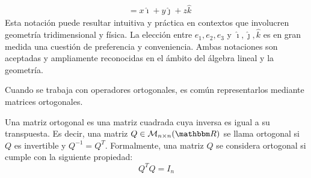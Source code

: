 \begin{example}
\begin{align*}
        & = x\hat{\imath} + y\hat{\jmath} + z\hat{k}
    \end{align*}
    Esta notación puede resultar intuitiva y práctica en contextos que involucren geometría tridimensional y física. La elección entre \( e_1, e_2, e_3 \) y \( \hat{\imath}, \hat{\jmath}, \hat{k} \) es en gran medida una cuestión de preferencia y conveniencia. Ambas notaciones son aceptadas y ampliamente reconocidas en el ámbito del álgebra lineal y la geometría.
\end{example}

Cuando se trabaja con operadores ortogonales, es común representarlos mediante matrices ortogonales.
\begin{definition}\label{def:matrixortogonal}
    Una matriz ortogonal es una matriz cuadrada cuya inversa es igual a su transpuesta. Es decir, una matriz $Q \in \mathcal{M}_{n \times n}(\RR)$ se llama ortogonal si $Q$ es invertible y $Q^{-1} = Q^T$. Formalmente, una matriz \( Q \) se considera ortogonal si cumple con la siguiente propiedad:
    \[ Q^T Q = I_n \]
\end{definition}

